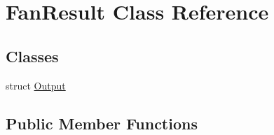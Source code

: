 \hypertarget{class_fan_result}{}\section{Fan\+Result Class Reference}
\label{class_fan_result}
\subsection*{Classes}
\begin{DoxyCompactItemize}
\item 
struct \hyperlink{struct_fan_result_1_1_output}{Output}
\end{DoxyCompactItemize}
\subsection*{Public Member Functions}
